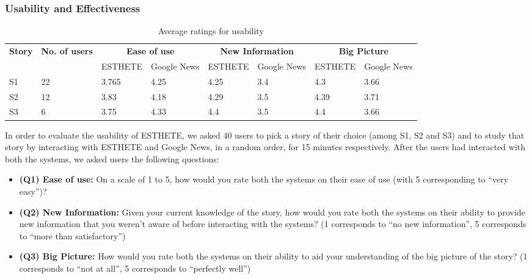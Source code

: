 \subsubsection{Usability and Effectiveness}
\label{subsec:usability}
\begin{table}
\begin{center}
\small
\begin{tabular}{|p{.75cm}|p{.75cm}|p{.75cm}|p{.75cm}|p{.75cm}|p{.75cm}|p{.75cm}|p{.75cm}|}
\hline
\multirow{2}{*}{{\bf Story}} & \multirow{2}{*}{{\bf No. of users}} & \multicolumn{2}{c}{{\bf Ease of use}} & \multicolumn{2}{c}{{\bf New Information}} & \multicolumn{2}{c}{{\bf Big Picture}}\\ \cline{3-8}
& & ESTHETE & Google News & ESTHETE & Google News & ESTHETE & Google News \\
\hline
S1 & 22 & 3.765 & 4.25 & 4.25 & 3.4 & 4.3 & 3.66\\
S2 & 12 & 3.83 & 4.18 & 4.29 & 3.5 & 4.39 & 3.71 \\
S3 & 6 & 3.75 & 4.33 & 4.4 & 3.5 & 4.4 & 3.66\\
\hline
\end{tabular}
\end{center}
\caption{Average ratings for usability}
\label{tab:ease}
\end{table}

\normalsize
In order to evaluate the usability of ESTHETE, we asked 40 users to pick a story of their choice (among S1, S2 and S3) and to study that story by interacting with ESTHETE and Google News, in a random order, for 15 minutes respectively. After the users had interacted with both the systems, we asked users the following questions:

\begin{itemize}
	\item {\bf (Q1) Ease of use:} On a scale of 1 to 5, how would you rate both the systems on their ease of use (with 5 corresponding to ``very easy'')?
	\item {\bf (Q2) New Information:} Given your current knowledge of the story, how would you rate both the systems on their ability to provide new information that you weren't aware of before interacting with the systems? (1 corresponds to ``no new information'', 5 corresponds to ``more than satisfactory'')
	\item {\bf (Q3) Big Picture:} How would you rate both the systems on their ability to aid your understanding of the big picture of the story? (1 corresponds to ``not at all'', 5 corresponds to ``perfectly well'')
\end{itemize}

